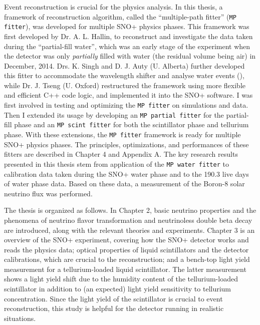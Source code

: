 Event reconstruction is crucial for the physics analysis. In this thesis, a framework of reconstruction algorithm, called the ``multiple-path fitter'' (\texttt{MP fitter}), was developed for multiple SNO+ physics phases. This framework was first developed by Dr. A. L. Hallin, to reconstruct and investigate the data taken during the ``partial-fill water'', which was an early stage of the experiment when the detector was only {\em partially} filled with water (the residual volume being air) in December, 2014\cite{partialWater}. Drs. K. Singh and D. J. Auty (U. Alberta) further developed this fitter to accommodate the wavelength shifter and analyse water events (\cite{davidPartialWater, kalpanaWLS, kalpanaWLS2, kalpanaMPFitter}), while Dr. J. Tseng (U. Oxford) restructured the framework using more flexible and efficient C++ code logic, and implemented it into the SNO+ software\cite{jieMPW}. I was first involved in testing and optimizing the \texttt{MP fitter} on simulations and data. Then I extended its usage by developing an \texttt{MP partial fitter} for the partial-fill phase and an \texttt{MP scint fitter} for both the scintillator phase and tellurium phase. With these extensions, the \texttt{MP fitter} framework is ready for multiple SNO+ physics phases. The principles, optimizations, and performances of these fitters are described in Chapter 4 and Appendix A. The key research results presented in this thesis stem from application of the \texttt{MP water fitter} to calibration data taken during the SNO+ water phase and to the 190.3 live days of water phase data. Based on these data, a measurement of the Boron-8 solar neutrino flux was performed.

The thesis is organized as follows. In Chapter 2, basic neutrino properties and the phenomena of neutrino flavor transformation and neutrinoless double beta decay are introduced, along with the relevant theories and experiments. Chapter 3 is an overview of the SNO+ experiment, covering how the SNO+ detector works and reads the physics data; optical properties of liquid scintillators and the detector calibrations, which are crucial to the reconstruction; and a bench-top light yield measurement for a tellurium-loaded liquid scintillator. The latter measurement shows a light yield shift due to the humidity content of the tellurium-loaded scintillator in addition to (an expected) light yield sensitivity to tellurium concentration. Since the light yield of the scintillator is crucial to event reconstruction, this study is helpful for the detector running in realistic situations.

